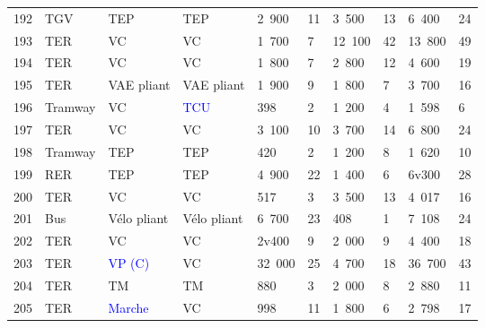 \begin{longtable}{p{0.7cm}p{1.4cm}p{1.4cm}p{1.6cm}p{0.8cm}p{0.8cm}p{0.8cm}p{0.8cm}p{1.1cm}p{1.1cm}}
    \small{192} & \small{TGV} & \small{TEP} & \small{TEP} & \small{2~900} & \small{11} & \small{3~500} & \small{13} & \small{6~400} & \small{24}\\
    \small{193} & \small{TER} & \small{VC} & \small{VC} & \small{1~700} & \small{7} & \small{12~100} & \small{42} & \small{13~800} & \small{49}\\
    \small{194} & \small{TER} & \small{VC} & \small{VC} & \small{1~800} & \small{7} & \small{2~800} & \small{12} & \small{4~600} & \small{19}\\
    \small{195} & \small{TER} & \small{VAE pliant} & \small{VAE pliant} & \small{1~900} & \small{9} & \small{1~800} & \small{7} & \small{3~700} & \small{16}\\
    \small{196} & \small{Tramway} & \small{VC} & \small{\textcolor{blue}{TCU}} & \small{398} & \small{2} & \small{1~200} & \small{4} & \small{1~598} & \small{6}\\
    \small{197} & \small{TER} & \small{VC} & \small{VC} & \small{3~100} & \small{10} & \small{3~700} & \small{14} & \small{6~800} & \small{24}\\
    \small{198} & \small{Tramway} & \small{TEP} & \small{TEP} & \small{420} & \small{2} & \small{1~200} & \small{8} & \small{1~620} & \small{10}\\
    \small{199} & \small{RER} & \small{TEP} & \small{TEP} & \small{4~900} & \small{22} & \small{1~400} & \small{6} & \small{6v300} & \small{28}\\
    \small{200} & \small{TER} & \small{VC} & \small{VC} & \small{517} & \small{3} & \small{3~500} & \small{13} & \small{4~017} & \small{16}\\
    \small{201} & \small{Bus} & \small{Vélo pliant} & \small{Vélo pliant} & \small{6~700} & \small{23} & \small{408} & \small{1} & \small{7~108} & \small{24}\\
    \small{202} & \small{TER} & \small{VC} & \small{VC} & \small{2v400} & \small{9} & \small{2~000} & \small{9} & \small{4~400} & \small{18}\\
    \small{203} & \small{TER} & \small{\textcolor{blue}{VP (C)}} & \small{VC} & \small{32~000} & \small{25} & \small{4~700} & \small{18} & \small{36~700} & \small{43}\\
    \small{204} & \small{TER} & \small{TM} & \small{TM} & \small{880} & \small{3} & \small{2~000} & \small{8} & \small{2~880} & \small{11}\\
    \small{205} & \small{TER} & \small{\textcolor{blue}{Marche}} & \small{VC} & \small{998} & \small{11} & \small{1~800} & \small{6} & \small{2~798} & \small{17}\\

\end{longtable}
